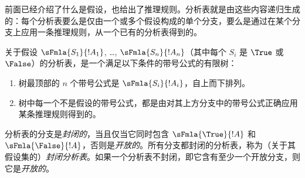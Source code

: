 \documentclass[../../../include/open-logic-section]{subfiles}
\begin{document}
      {}
      {}


\begin{explain}
前面已经介绍了什么是假设，也给出了推理规则。分析表就是由这些内容递归生成的：每个分析表要么是仅由一个或多个假设构成的单个分支，要么是通过在某个分支上应用一条推理规则，从一个已有的分析表得到的。
\end{explain}

\begin{defn}[分析表]
关于假设 $\sFmla{S_1}{!A_1}$, \dots,
$\sFmla{S_n}{!A_n}$（其中每个 $S_i$ 是 $\True$ 或~$\False$）的分析表，是一个满足以下条件的带号公式的有限树：
\begin{enumerate}
\item 树最顶部的 $n$ 个带号公式是
  $\sFmla{S_i}{!A_i}$，自上而下排列。
\item 树中每一个不是假设的带号公式，都是由对其上方分支中的带号公式正确应用某条推理规则得到的。
\end{enumerate}
分析表的分支是\emph{封闭的}，当且仅当它同时包含 $\sFmla{\True}{!A}$ 和~$\sFmla{\False}{!A}$，否则是\emph{开放的}。所有分支都封闭的分析表，称为（关于其假设集的）\emph{封闭分析表}。如果一个分析表不封闭，即它含有至少一个开放分支，则它是\emph{开放的}。
\end{defn}
\end{document}
